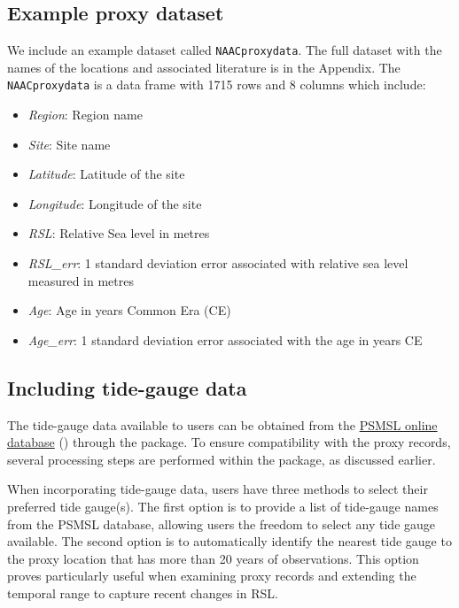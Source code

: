 \subsection{Example proxy dataset}\label{exampledataset}

We include an example dataset called \texttt{NAACproxydata}. The full dataset with the names of the locations and associated literature is in the Appendix. The \texttt{NAACproxydata} is a data frame with 1715 rows and 8 columns which include:

\begin{itemize}
\tightlist
\item
  \emph{Region}: Region name
\item
  \emph{Site}: Site name
\item
  \emph{Latitude}: Latitude of the site
\item
  \emph{Longitude}: Longitude of the site
\item
  \emph{RSL}: Relative Sea level in metres
\item
  \emph{RSL\_err}: 1 standard deviation error associated with relative sea level measured in metres
\item
  \emph{Age}: Age in years Common Era (CE)
\item
  \emph{Age\_err}: 1 standard deviation error associated with the age in years CE
\end{itemize}

\subsection{Including tide-gauge data}\label{additionaldata}

The tide-gauge data available to users can be obtained from the \href{https://psmsl.org/data/obtaining/complete.php}{PSMSL online database} (\citep{Holgate_PSMSL2013, Woodworth2003}) through the  package. To ensure compatibility with the proxy records, several processing steps are performed within the package, as discussed earlier.

When incorporating tide-gauge data, users have three methods to select their preferred tide gauge(s). The first option is to provide a list of tide-gauge names from the PSMSL database, allowing users the freedom to select any tide gauge available. The second option is to automatically identify the nearest tide gauge to the proxy location that has more than 20 years of observations. This option proves particularly useful when examining proxy records and extending the temporal range to capture recent changes in RSL.

